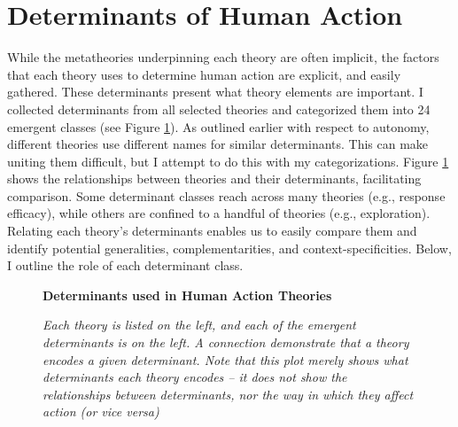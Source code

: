 \documentclass[12 pt]{article}
\begin{document}
\section{Determinants of Human Action}
While the metatheories underpinning each theory are often implicit, the factors that each theory uses to determine human action are explicit, and easily gathered. These determinants present what theory elements are important. I collected determinants from all selected theories and categorized them into 24 emergent classes (see Figure \ref{fig:fact}).  As outlined earlier with respect to autonomy, different theories use different names for similar determinants. This can make uniting them difficult, but I attempt to do this with my categorizations. Figure \ref{fig:fact} shows the relationships between theories and their determinants, facilitating comparison. Some determinant classes reach across many theories (e.g., response efficacy), while others are confined to a handful of theories (e.g., exploration). Relating each theory's determinants enables us to easily compare them and identify potential generalities, complementarities, and context-specificities. Below, I outline the role of each determinant class.
\begin{figure}
	\centering
	\textbf{Determinants used in Human Action Theories}\par \medskip
	
	\caption{\textit{Each theory is listed on the left, and each of the emergent determinants is on the left. A connection demonstrate that a theory encodes a given determinant. Note that this plot merely shows what determinants each theory encodes -- it does not show the relationships between determinants, nor the way in which they affect action (or vice versa)}}
	\label{fig:fact}
\end{figure}
\end{document}
